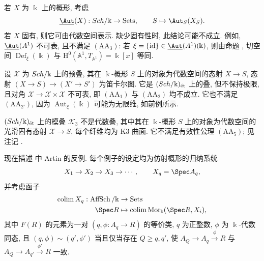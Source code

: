 \begin{example}[概形的自同构]\label{src:C.7.13}
若 $X$ 为 $\Bbbk$ 上的概形, 考虑
\[
\underline{\Aut}(X):\Sch/\Bbbk\to\mathrm{Sets},\qquad S\mapsto\Aut_S(X_S).
\]
若 $X$ 固有, 则它可由代数空间表示. 缺少固有性时, 此结论可能不成立. 例如, $\underline{\Aut}(\mathbb A^1)$ 不可表, 且不满足 $(\mathrm{AA}_3)$: 若 $\xi=\{\mathrm{id}\}\in\underline{\Aut}(\mathbb A^1)(\Bbbk)$, 则由命题 , 切空间 $\operatorname{Def}_{\xi}(\Bbbk)$ 与 $\mathrm H^0(\mathbb A^1,T_{\mathbb A^1})=\Bbbk[x]$ 等同.
\end{example}
\begin{example}[所有代数空间的叠]\label{src:C.7.14}
设 $\mathcal X$ 为 $Sch/\Bbbk$ 上的预叠, 其在 $\Bbbk$-概形 $S$ 上的对象为代数空间的态射 $X\to S$, 态射 $(X\to S)\to(X'\to S')$ 为笛卡尔图. 它是 $(Sch/\Bbbk)_{\text{ét}}$ 上的叠, 但不保持极限, 且对角 $\mathcal X\to\mathcal X\times\mathcal X$ 不可表, 即 $(\mathrm{AA}_1)$ 与 $(\mathrm{AA}_2)$ 均不成立. 它也不满足 $(\mathrm{AA}_{2'})$, 因为 $\operatorname{Aut}_{\xi}(\Bbbk)$ 可能为无限维, 如前例所示.
\end{example}
\begin{example}[K3 曲面的叠]\label{src:C.7.15}
$(Sch/\Bbbk)_{\text{ét}}$ 上的模叠 $\mathcal K_3$ 不是代数叠, 其中其在 $\Bbbk$-概形 $S$ 上的对象为代数空间的光滑固有态射 $\mathcal X\to S$, 每个纤维均为 K3 曲面. 它不满足有效性公理 $(\mathrm{AA}_5)$; 见注记 .
\end{example}
现在描述 \cite{Art69c} 中 Artin 的反例. 每个例子的设定均为仿射概形的归纳系统
\[
X_1\to X_2\to X_3\to\cdots,\qquad X_q=\Spec A_q,
\]
并考虑函子
\[
\begin{aligned}
\operatorname{colim}X_q:\operatorname{AffSch}/\Bbbk&\to\mathrm{Sets}\\
\Spec R&\mapsto\operatorname{colim}\operatorname{Mor}_{\Bbbk}(\Spec R,X_i),
\end{aligned}
\]
其中 $F(R)$ 的元素为一对 $(q,\phi:A_q\to R)$ 的等价类, $q$ 为正整数, $\phi$ 为 $\Bbbk$-代数同态, 且 $(q,\phi)\sim(q',\phi')$ 当且仅当存在 $Q\geq q,q'$, 使 $A_Q\to A_q\xrightarrow\phi R$ 与 $A_Q\to A_{q'}\xrightarrow{\phi'}R$ 一致.

